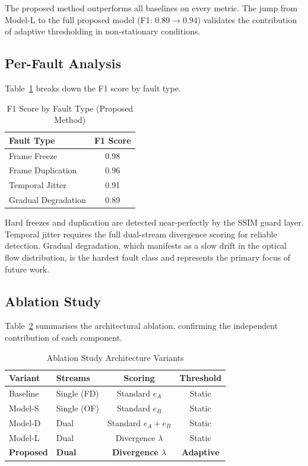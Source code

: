 \documentclass[conference]{IEEEtran}
\begin{document}
The proposed method outperforms all baselines on every metric.  The jump
from Model-L to the full proposed model (F1: $0.89 \rightarrow 0.94$)
validates the contribution of adaptive thresholding in non-stationary
conditions.

\subsection{Per-Fault Analysis}
Table~\ref{tab:perfault} breaks down the F1 score by fault type.

\begin{table}[htbp]
\centering
\caption{F1 Score by Fault Type (Proposed Method)}
\label{tab:perfault}
\begin{tabular}{@{}lc@{}}
\toprule
\textbf{Fault Type}  & \textbf{F1 Score} \\ \midrule
Frame Freeze         & 0.98 \\
Frame Duplication    & 0.96 \\
Temporal Jitter      & 0.91 \\
Gradual Degradation  & 0.89 \\
\bottomrule
\end{tabular}
\end{table}

Hard freezes and duplication are detected near-perfectly by the SSIM
guard layer.  Temporal jitter requires the full dual-stream divergence
scoring for reliable detection.  Gradual degradation, which manifests as
a slow drift in the optical flow distribution, is the hardest fault class
and represents the primary focus of future work.

\subsection{Ablation Study}
Table~\ref{tab:ablation} summarises the architectural ablation, confirming
the independent contribution of each component.

\begin{table}[htbp]
\centering
\caption{Ablation Study Architecture Variants}
\label{tab:ablation}
\begin{tabular}{@{}llcc@{}}
\toprule
\textbf{Variant} & \textbf{Streams} & \textbf{Scoring} & \textbf{Threshold} \\ \midrule
Baseline   & Single (FD)   & Standard $e_A$        & Static   \\
Model-S    & Single (OF)   & Standard $e_B$        & Static   \\
Model-D    & Dual          & Standard $e_A+e_B$    & Static   \\
Model-L    & Dual          & Divergence $\lambda$  & Static   \\
\textbf{Proposed} & \textbf{Dual} & \textbf{Divergence $\lambda$} & \textbf{Adaptive} \\
\bottomrule
\end{tabular}
\end{table}
\end{document}
